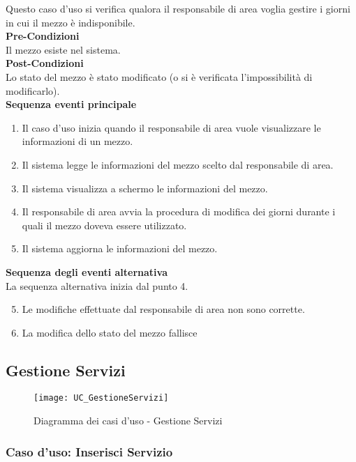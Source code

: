 \documentclass[green, fancy, 11pt]{elegantbook}
\begin{document}
Questo caso d’uso si verifica qualora il responsabile di area voglia gestire i giorni in cui il mezzo è indisponibile.\\
\textbf{Pre-Condizioni}\\
Il mezzo esiste nel sistema.\\
\textbf{Post-Condizioni}\\
Lo stato del mezzo è stato modificato (o si è verificata l’impossibilità di modificarlo).\\
\textbf{Sequenza eventi principale}
\begin{enumerate}
	\item Il caso d’uso inizia quando il responsabile di area vuole visualizzare le informazioni di un mezzo.
	\item Il sistema legge le informazioni del mezzo scelto dal responsabile di area.
	\item Il sistema visualizza a schermo le informazioni del mezzo.
	\item Il responsabile di area avvia la procedura di modifica dei giorni durante i quali il mezzo doveva essere utilizzato.
	\item Il sistema aggiorna le informazioni del mezzo.
\end{enumerate}
\textbf{Sequenza degli eventi alternativa}\\
La sequenza alternativa inizia dal punto 4.
\begin{enumerate}
	\setcounter{enumi}{4}
	\item Le modifiche effettuate dal responsabile di area non sono corrette.
	\item La modifica dello stato del mezzo fallisce
\end{enumerate}
\newpage

\subsection{Gestione Servizi}
\begin{figure}[H]
	\centering
	\texttt{[image: UC\_GestioneServizi]}
	\caption{Diagramma dei casi d'uso - Gestione Servizi}
\end{figure}

\subsubsection{Caso d'uso: Inserisci Servizio}
\end{document}

